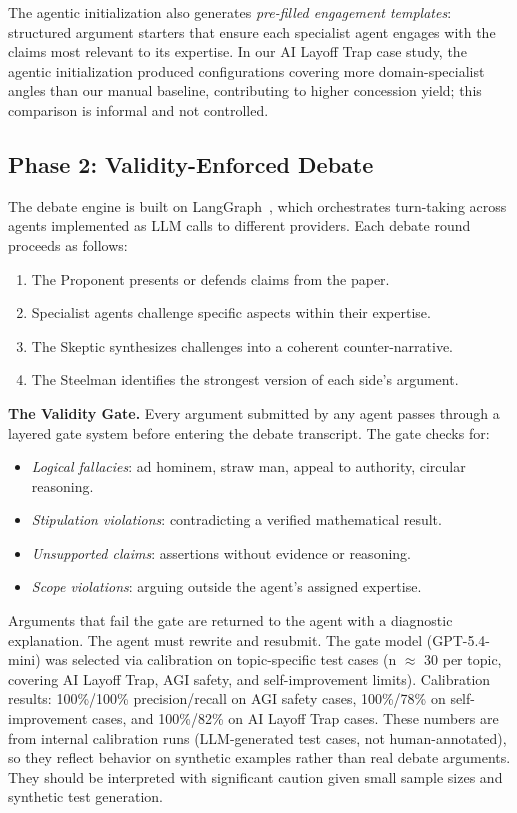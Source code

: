 \documentclass[11pt]{article}
\begin{document}
The agentic initialization also generates \emph{pre-filled engagement templates}: structured argument starters that ensure each specialist agent engages with the claims most relevant to its expertise.
In our AI Layoff Trap case study, the agentic initialization produced configurations covering more domain-specialist angles than our manual baseline, contributing to higher concession yield; this comparison is informal and not controlled.


\subsection{Phase 2: Validity-Enforced Debate}

The debate engine is built on LangGraph~\cite{langgraph2024}, which orchestrates turn-taking across agents implemented as LLM calls to different providers.
Each debate round proceeds as follows:

\begin{enumerate}[leftmargin=*,itemsep=2pt]
\item The Proponent presents or defends claims from the paper.
\item Specialist agents challenge specific aspects within their expertise.
\item The Skeptic synthesizes challenges into a coherent counter-narrative.
\item The Steelman identifies the strongest version of each side's argument.
\end{enumerate}

\noindent\textbf{The Validity Gate.}
Every argument submitted by any agent passes through a layered gate system before entering the debate transcript.
The gate checks for:
\begin{itemize}[leftmargin=*,itemsep=1pt]
\item \emph{Logical fallacies}: ad hominem, straw man, appeal to authority, circular reasoning.
\item \emph{Stipulation violations}: contradicting a verified mathematical result.
\item \emph{Unsupported claims}: assertions without evidence or reasoning.
\item \emph{Scope violations}: arguing outside the agent's assigned expertise.
\end{itemize}

Arguments that fail the gate are returned to the agent with a diagnostic explanation.
The agent must rewrite and resubmit.
The gate model (GPT-5.4-mini) was selected via calibration on topic-specific test cases (n $\approx$ 30 per topic, covering AI Layoff Trap, AGI safety, and self-improvement limits). Calibration results: 100\%/100\% precision/recall on AGI safety cases, 100\%/78\% on self-improvement cases, and 100\%/82\% on AI Layoff Trap cases. These numbers are from internal calibration runs (LLM-generated test cases, not human-annotated), so they reflect behavior on synthetic examples rather than real debate arguments. They should be interpreted with significant caution given small sample sizes and synthetic test generation.
\end{document}
